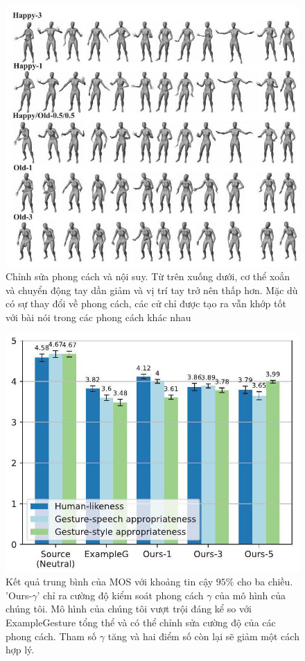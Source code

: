 \begin{figure}
    \centering
    \includegraphics[width=\linewidth]{images/style_sample.jpg}
    \caption[Chỉnh sửa phong cách và nội suy]{Chỉnh sửa phong cách và nội suy. Từ trên xuống dưới, cơ thể xoắn và chuyển động tay dần giảm và vị trí tay trở nên thấp hơn. Mặc dù có sự thay đổi về phong cách, các cử chỉ được tạo ra vẫn khớp tốt với bài nói trong các phong cách khác nhau}
    \label{fig:stylesample}
\end{figure}



\begin{figure}
    \centering
    \includegraphics[width=\linewidth]{images/mos_score.jpg}
    \caption[Kết quả trung bình của MOS]{Kết quả trung bình của MOS với khoảng tin cậy $95\%$ cho ba chiều. 'Ours-$\gamma$' chỉ ra cường độ kiểm soát phong cách $\gamma$ của mô hình của chúng tôi. Mô hình của chúng tôi vượt trội đáng kể so với ExampleGesture tổng thể và có thể chỉnh sửa cường độ của các phong cách. Tham số $\gamma$ tăng và hai điểm số còn lại sẽ giảm một cách hợp lý.}
    \label{fig:mosscore}
\end{figure}


